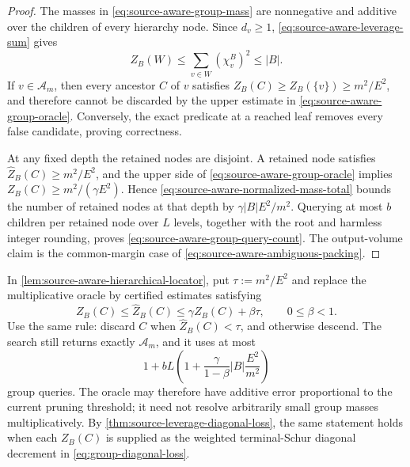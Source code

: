 \begin{proof}
The masses in \cref{eq:source-aware-group-mass} are nonnegative and additive
over the children of every hierarchy node.  Since $d_v\geq1$,
\cref{eq:source-aware-leverage-sum} gives
\begin{equation}
 Z_B(W)\leq\sum_{v\in W}(\chi_v^B)^2\leq |B|.
 \label{eq:source-aware-normalized-mass-total}
\end{equation}
If $v\in\mathcal A_m$, then every ancestor $C$ of $v$ satisfies
$Z_B(C)\geq Z_B(\{v\})\geq m^2/E^2$, and therefore cannot be discarded by
the upper estimate in \cref{eq:source-aware-group-oracle}.  Conversely, the
exact predicate at a reached leaf removes every false candidate, proving
correctness.

At any fixed depth the retained nodes are disjoint.  A retained node satisfies
$\widehat Z_B(C)\geq m^2/E^2$, and the upper side of
\cref{eq:source-aware-group-oracle} implies
$Z_B(C)\geq m^2/(\gamma E^2)$.  Hence
\cref{eq:source-aware-normalized-mass-total} bounds the number of retained
nodes at that depth by $\gamma|B|E^2/m^2$.  Querying at most $b$ children per
retained node over $L$ levels, together with the root and harmless integer
rounding, proves \cref{eq:source-aware-group-query-count}.  The output-volume
claim is the common-margin case of
\cref{eq:source-aware-ambiguous-packing}.
\end{proof}

\begin{corollary}
\label{cor:additive-group-locator}
In \cref{lem:source-aware-hierarchical-locator}, put
$\tau:=m^2/E^2$ and replace the multiplicative oracle by certified estimates
satisfying
\begin{equation}
 Z_B(C)\leq\widehat Z_B(C)
 \leq\gamma Z_B(C)+\beta\tau,
 \qquad 0\leq\beta<1.
 \label{eq:additive-group-oracle}
\end{equation}
Use the same rule: discard $C$ when $\widehat Z_B(C)<\tau$, and otherwise
descend.  The search still returns exactly $\mathcal A_m$, and it uses at
most
\begin{equation}
 1+bL\left(
  1+\frac{\gamma}{1-\beta}|B|\frac{E^2}{m^2}
 \right)
 \label{eq:additive-group-query-count}
\end{equation}
group queries.  The oracle may therefore have additive error proportional to
the current pruning threshold; it need not resolve arbitrarily small group
masses multiplicatively.  By
\cref{thm:source-leverage-diagonal-loss}, the same statement holds when each
$Z_B(C)$ is supplied as the weighted terminal-Schur diagonal decrement in
\cref{eq:group-diagonal-loss}.
\end{corollary}


